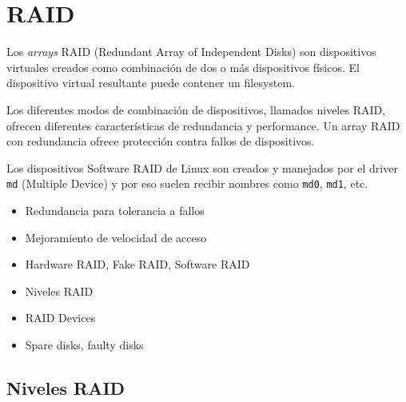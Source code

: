 
\section{RAID}

Los \emph{arrays} RAID (Redundant Array of Independent Disks) son dispositivos virtuales creados como combinación de dos o más dispositivos físicos. El dispositivo virtual resultante puede contener un filesystem. 

Los diferentes modos de combinación de dispositivos, llamados niveles RAID, ofrecen diferentes características de redundancia y performance. Un array RAID con redundancia ofrece protección contra fallos de dispositivos. 

Los dispositivos Software RAID de Linux son creados y manejados por el driver \lstinline{md} (Multiple Device) y por eso suelen recibir nombres como \lstinline{md0}, \lstinline{md1}, etc.

 
\begin{itemize}
	\item Redundancia para tolerancia a fallos
	\item Mejoramiento de velocidad de acceso
	\item Hardware RAID, Fake RAID, Software RAID
	\item Niveles RAID
	\item RAID Devices
	\item Spare disks, faulty disks
\end{itemize}



\subsection {Niveles RAID}

